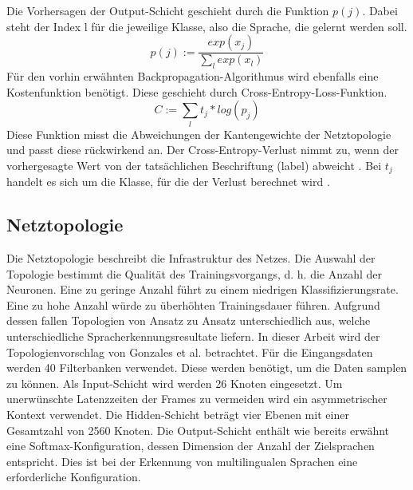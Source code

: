  Die Vorhersagen der Output-Schicht geschieht durch die Funktion $p(j)$. Dabei steht der Index l für die jeweilige Klasse, also die Sprache, die gelernt werden soll.  
\begin{equation*}
p(j) := \frac{ exp(x_{j}) }{\sum_{l}{}{ exp(x_{l})} }
\label{eq:soft}
\end{equation*}
Für den vorhin erwähnten Backpropagation-Algorithmus wird ebenfalls eine Kostenfunktion benötigt. Diese geschieht durch Cross-Entropy-Loss-Funktion. 
\begin{equation*}
C:= \sum_{l}{}{ t_{j} * log(p_{j})} 
\label{eq:back}
\end{equation*}
Diese Funktion misst die Abweichungen der Kantengewichte der Netztopologie und passt diese rückwirkend an. Der Cross-Entropy-Verlust nimmt zu, wenn der vorhergesagte Wert von der tatsächlichen Beschriftung (label) abweicht \cite{MLCheatsheet.2017}. Bei $t_{j}$ handelt es sich um die Klasse, für die der Verlust berechnet wird \cite{GonzalezDominguez.2015}.

\subsection{Netztopologie}
Die Netztopologie beschreibt die Infrastruktur des Netzes. Die Auswahl der Topologie bestimmt die Qualität des Trainingsvorgangs, d. h. die Anzahl der Neuronen. Eine zu geringe Anzahl führt zu einem niedrigen Klassifizierungsrate. Eine zu hohe Anzahl würde zu überhöhten Trainingsdauer führen. Aufgrund dessen fallen Topologien von Ansatz zu Ansatz unterschiedlich aus, welche unterschiedliche Spracherkennungsresultate liefern. In dieser Arbeit wird der Topologienvorschlag von Gonzales et al. betrachtet. Für die Eingangsdaten werden 40 Filterbanken verwendet. Diese werden benötigt, um die Daten samplen zu können. Als Input-Schicht wird werden 26 Knoten eingesetzt. Um unerwünschte Latenzzeiten der Frames zu vermeiden wird ein asymmetrischer Kontext verwendet. Die Hidden-Schicht beträgt vier Ebenen mit einer Gesamtzahl von 2560 Knoten. Die Output-Schicht enthält wie bereits erwähnt eine Softmax-Konfiguration, dessen Dimension der Anzahl der Zielsprachen entspricht. Dies ist bei der Erkennung von multilingualen Sprachen eine erforderliche Konfiguration.
 
